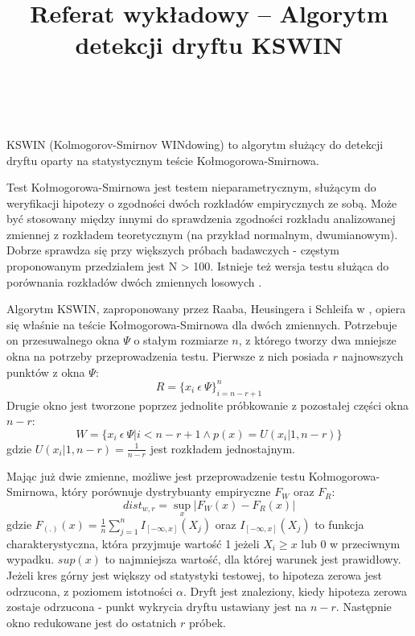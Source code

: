 \documentclass{classrep}
\author{%
  \studentinfo{Paweł Galewicz}{234053}\\
  \studentinfo{Karol Podlewski}{234106}%
}
\title{Referat wykładowy -- Algorytm\\detekcji dryftu KSWIN}
\begin{document}
\maketitle



KSWIN (Kolmogorov-Smirnov WINdowing) to algorytm służący do detekcji dryftu oparty na statystycznym teście Kołmogorowa-Smirnowa.

Test Kołmogorowa-Smirnowa jest testem nieparametrycznym, służącym do weryfikacji hipotezy o zgodności dwóch rozkładów empirycznych ze sobą. Może być stosowany między innymi do sprawdzenia zgodności rozkładu analizowanej zmiennej z rozkładem teoretycznym (na przykład normalnym, dwumianowym). Dobrze sprawdza się przy większych próbach badawczych - częstym proponowanym przedziałem jest N > 100. Istnieje też  wersja testu służąca do porównania rozkładów dwóch zmiennych losowych \cite{KST}.

Algorytm KSWIN, zaproponowany przez Raaba, Heusingera i Schleifa w \cite{KSWIN}, opiera się właśnie na teście Kołmogorowa-Smirnowa dla dwóch zmiennych. Potrzebuje on przesuwalnego okna $\Psi$ o stałym rozmiarze $n$, z którego tworzy dwa mniejsze okna na potrzeby przeprowadzenia testu. Pierwsze z nich posiada $r$ najnowszych punktów z okna $\Psi$:
\begin{equation}
R = \{x_i \ \epsilon \ \Psi\}^n_{i=n-r+1}
\end{equation}
Drugie okno jest tworzone poprzez jednolite próbkowanie z pozostałej części okna $n - r$:
\begin{equation}
W = \{x_i \  \epsilon \ \Psi | i < n - r + 1 \wedge p(x) = U(x_i|1,n-r) \}
\end{equation}
gdzie $U(x_i|1,n-r) = \frac{1}{n-r}$ jest rozkładem jednostajnym. 

Mając już dwie zmienne, możliwe jest przeprowadzenie testu Kołmogorowa-\\Smirnowa, który porównuje dystrybuanty empiryczne $F_W$ oraz $F_R$:
\begin{equation}
dist_{w,r} = \sup_{x} | F_W(x) - F_R(x)|
\end{equation}
gdzie $F_{(.)}(x)=\frac{1}{n}\sum^n_{j=1}I_{[-\infty,x]}(X_j)$ oraz $I_{[-\infty,x]}(X_j)$ to funkcja charakterystyczna, która przyjmuje wartość 1 jeżeli $X_i \geq x$ lub 0 w przeciwnym wypadku. $sup(x)$ to najmniejsza wartość, dla której warunek jest prawidłowy. Jeżeli kres górny jest większy od statystyki testowej, to hipoteza zerowa jest odrzucona, z poziomem istotności $\alpha$. Dryft jest znaleziony, kiedy hipoteza zerowa zostaje odrzucona - punkt wykrycia dryftu ustawiany jest na $n-r$. Następnie okno redukowane jest do ostatnich $r$ próbek.
\end{document}
